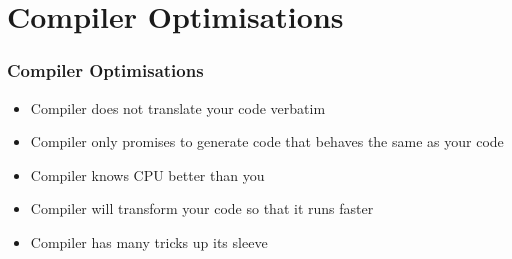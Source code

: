 \section{Compiler Optimisations}

\frame{\tableofcontents[currentsection]}

\begin{frame}
  \frametitle{Compiler Optimisations}
  \begin{itemize}
    \item Compiler does not translate your code verbatim
    \item Compiler only promises to generate code that behaves the same as your code
    \item Compiler knows CPU better than you
    \item Compiler will transform your code so that it runs faster
    \item Compiler has many tricks up its sleeve
  \end{itemize}
\end{frame}











